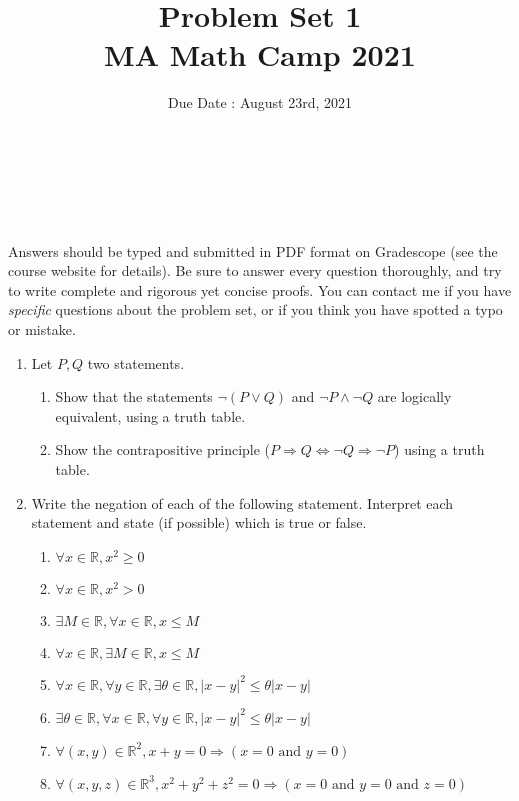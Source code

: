 \documentclass[11pt,letterpaper]{scrartcl}
\title{Problem Set 1 \\ MA Math Camp 2021 }
\author{ Due Date : August 23rd, 2021 }
\date{  }
\makeatletter
\newcommand{\reals}{\mathbb{R}}
\let\thetitle\@title
\let\theauthor\@author
\let\thedate\@date
\newcommand\makesimpletitle{%
\noindent 
\textbf{\large \thetitle} \\
\-\ \hspace{.2cm} { \large \theauthor } \\ 
\-\ \hspace{.2cm} { \normalsize \thedate }
}
\makeatother
\begin{document}


\makesimpletitle

Answers should be typed and submitted in PDF format on Gradescope (see the course website for details). Be sure to answer every question thoroughly, and try to write complete and rigorous yet concise proofs. You can contact me if you have \emph{specific} questions about the problem set, or if you think you have spotted a typo or mistake.

\vspace{.5cm}

\begin{enumerate}
	
	\item Let $P,Q$ two statements.
	\begin{enumerate}[label=\alph*.]
		\item Show that the statements $\neg (P \vee Q)$ and $\neg P \wedge \neg Q$ are logically equivalent, using a truth table.
		\item Show the contrapositive principle ($P \Rightarrow Q \Leftrightarrow \neg Q \Rightarrow \neg P$) using a truth table.
	\end{enumerate}


	\item 
	Write the negation of each of the following statement. Interpret each statement and state (if possible) which is true or false.
		\begin{enumerate}[label=\alph*.]
			\item $\forall x \in \reals, x^2 \geq 0$
			\item $\forall x \in \reals, x^2 > 0$
			\item $\exists M \in \reals, \forall x \in \reals, x \leq M$
			\item $\forall x \in \reals, \exists M \in \reals, x \leq M$
			\item $\forall x \in \reals, \forall y \in \reals, \exists \theta \in \reals, |x-y|^2 \leq \theta|x-y|$
			\item $\exists \theta \in \reals, \forall x \in \reals, \forall y \in \reals, |x-y|^2 \leq \theta|x-y|$
			\item $\forall (x,y) \in \reals^2, x+y=0 \Rightarrow (x=0 \text{ and } y=0)$
			\item $\forall (x,y,z) \in \reals^3, x^2+y^2+z^2=0 \Rightarrow (x=0 \text{ and } y=0 \text{ and } z=0)$
		\end{enumerate}



\end{enumerate}
\end{document}
